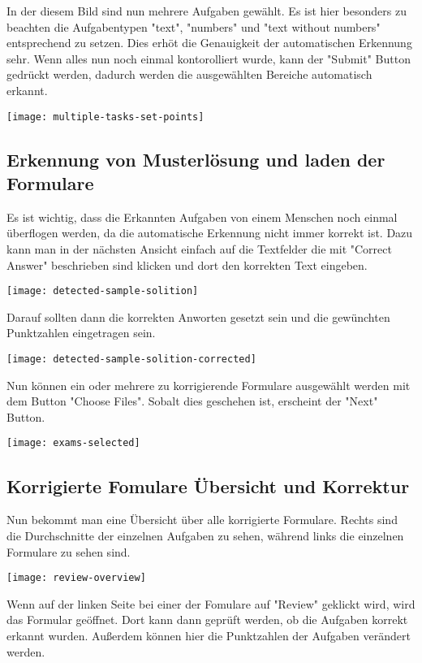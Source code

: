 In der diesem Bild sind nun mehrere Aufgaben gew\"ahlt.
Es ist hier besonders zu beachten die Aufgabentypen "text", "numbers" und "text without numbers" entsprechend zu setzen.
Dies erh\"ot die Genauigkeit der automatischen Erkennung sehr.
Wenn alles nun noch einmal kontorolliert wurde, kann der "Submit" Button gedr\"uckt werden, dadurch werden die ausgew\"ahlten Bereiche automatisch erkannt.

\texttt{[image: multiple-tasks-set-points]}

\subsection{Erkennung von Musterl\"osung und laden der Formulare}

Es ist wichtig, dass die Erkannten Aufgaben von einem Menschen noch einmal \"uberflogen werden, da die automatische Erkennung nicht immer korrekt ist.
Dazu kann man in der n\"achsten Ansicht einfach auf die Textfelder die mit "Correct Answer" beschrieben sind klicken und dort den korrekten Text eingeben.

\texttt{[image: detected-sample-solition]}

Darauf sollten dann die korrekten Anworten gesetzt sein und die gew\"unchten Punktzahlen eingetragen sein.

\texttt{[image: detected-sample-solition-corrected]}

Nun k\"onnen ein oder mehrere zu korrigierende Formulare ausgew\"ahlt werden mit dem Button "Choose Files".
Sobalt dies geschehen ist, erscheint der "Next" Button.

\texttt{[image: exams-selected]}

\subsection{Korrigierte Fomulare \"Ubersicht und Korrektur}

Nun bekommt man eine \"Ubersicht \"uber alle korrigierte Formulare.
Rechts sind die Durchschnitte der einzelnen Aufgaben zu sehen, w\"ahrend links die einzelnen Formulare zu sehen sind.

\texttt{[image: review-overview]}

Wenn auf der linken Seite bei einer der Fomulare auf "Review" geklickt wird, wird das Formular ge\"offnet.
Dort kann dann gepr\"uft werden, ob die Aufgaben korrekt erkannt wurden.
Au{\ss}erdem k\"onnen hier die Punktzahlen der Aufgaben ver\"andert werden.

